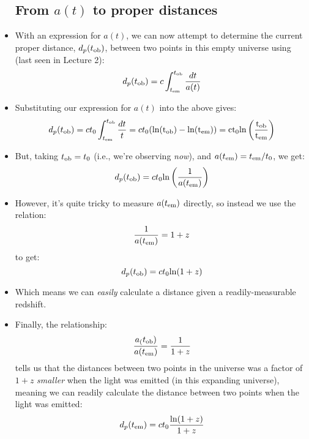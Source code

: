 \documentclass[11pt]{article}
\begin{document}
\begin{itemize}
\subsection{From $a(t)$ to proper distances}
\item With an expression for $a(t)$, we can now attempt to determine the current proper distance, $d_p(t_{\rm ob})$,  between two points in this empty universe using (last seen in Lecture 2):
\begin{equation}
d_p(t_{\rm ob}) = c\int_{t_{\rm em}}^{t_{\rm ob}} \frac{dt}{a(t)}
\end{equation}
\item Substituting our expression for $a(t)$ into the above gives:
\begin{equation}
    d_p(t_{\rm ob}) = ct_0\int_{t_{\rm em}}^{t_{\rm ob}}\frac{dt}{t} = ct_0(\rm ln(t_{\rm ob})-ln(t_{\rm em})) = ct_0ln\left(\frac{t_{\rm ob}}{t_{\rm em}}\right)
\end{equation}
\item But, taking $t_{\rm ob}=t_0$ (i.e., we're observing {\it now}), and $a(t_{\rm em})=t_{\rm em}/t_0$, we get:
\begin{equation}
    d_p(t_{\rm ob}) = ct_0{\rm ln}\left(\frac{1}{a(t_{\rm em})}\right)
\end{equation} 
\item However, it's quite tricky to measure $a(t_{\rm em})$ directly, so instead we use the relation:
\begin{equation}
    \frac{1}{a(t_{\rm em})} = 1+z
\end{equation} 
to get:
\begin{equation}
d_p(t_{\rm ob}) = ct_0{\rm ln}(1+z)
\end{equation} 
\item Which means we can {\it easily} calculate a distance given a readily-measurable redshift.
\item Finally, the relationship:
\begin{equation}
\frac{a_(t_{\rm ob})}{a(t_{\rm em})} = \frac{1}{1+z}
\end{equation}    
tells us that the distances between two points in the universe was a factor of $1+z$ {\it smaller} when the light was emitted (in this expanding universe), meaning we can readily calculate the distance between two points when the light was emitted:
\begin{equation}
    d_p(t_{\rm em}) = ct_0\frac{{\rm ln}(1+z)}{1+z}
    \end{equation} 
    
\end{itemize}
\end{document}
